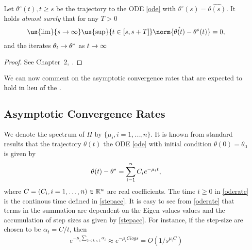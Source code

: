 \begin{theorem}\label{sadim}
Let $\theta^s(t), t\geq s$ be the trajectory to the ODE \eqref{ode} with $\theta^s(s)=\hat{\theta(s)}$. It holds \emph{almost surely} that for any $T>0$
\begin{align}
\us{\lim}{s\ra\infty} \us{\sup}{t\in[s,s+T]}\norm{\hat{\theta(t)}- \theta^s(t)} = 0,
\end{align}
and the iterates $\theta_t \rightarrow \theta^*$ as $t\rightarrow\infty$
\end{theorem}
\begin{proof}
See Chapter~$2$, \cite{SA}.
\end{proof}
We can now comment on the asymptotic convergence rates that are expected to hold in lieu of the .
\subsection{Asymptotic Convergence Rates}\label{initial}
We denote the spectrum of $H$ by $\{\mu_i,i=1,\ldots,n\}$. It is known from standard results that the trajectory $\theta(t)$ the ODE \eqref{ode} with initial condition $\theta(0)=\theta_0$ is given by
\begin{align}\label{oderate}
\theta(t)-\theta^*=\sum_{i=1}^n C_i e^{-\mu_i t},
\end{align}
where $C=(C_i,i=1,\ldots,n)\in \mathbb{R}^n$ are real coefficients. The time $t\geq 0$ in \eqref{oderate} is the continous time defined in \eqref{stepacc}. It is easy to see from \eqref{oderate} that terms in the summation are dependent on the Eigen values values and the accumulation of step sizes as given by \eqref{stepacc}. For instance, if the step-size are chosen to be $\alpha_t=C/t$, then
\begin{align}\label{biasforget}e^{-\mu_i\sum_{0\leq k<t}\alpha_t}\approx e^{-\mu_i Clog s}=O(1/s^{\mu_i C})\end{align}
